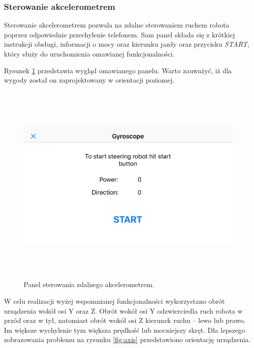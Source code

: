 \subsubsection{Sterowanie akcelerometrem}
Sterowanie akcelerometrem pozwala na zdalne sterowaniem ruchem robota poprzez odpowiednie przechylenie telefonem. Sam panel składa się z krótkiej instrukcji obsługi, informacji o mocy oraz kierunku jazdy oraz przycisku \textit{START}, który służy do uruchomienia omawianej funkcjonalności.


Rysunek \ref{fig:accview} przedstawia wygląd omawianego panelu. Warto zauważyć, iż dla wygody został on zaprojektowany w orientacji poziomej.

\begin{figure}[H]
	\centering
		\includegraphics[width=0.75\linewidth, height=10cm, keepaspectratio, fbox]{pic05/gyro.PNG}
	\caption{Panel sterowania zdalnego akcelerometrem.}
	\label{fig:accview}	
\end{figure}

W celu realizacji wyżej wspomnianej funkcjonalności wykorzystano obrót urządzenia wokół osi Y oraz Z. Obrót wokół osi Y odzwierciedla ruch robota w przód oraz w tył, natomiast obrót wokół osi Z kierunek ruchu – lewo lub prawo. Im większe wychylenie tym większa prędkość lub mocniejszy skręt. Dla lepszego zobrazowania problemu na rysunku \ref{fig:axis} przedstawiono orientację urządzenia.


